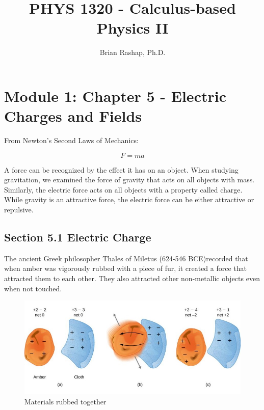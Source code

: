 \documentclass[14pt]{memoir}
\author{Brian Rashap, Ph.D.}
\title{PHYS 1320 - Calculus-based Physics II}
\begin{document}
\frontmatter

\maketitle


\mainmatter

\chapter{Module 1: Chapter 5 - Electric Charges and Fields}

From Newton's Second Laws of Mechanics:

\begin{equation}
F = ma
\end{equation}

A force can be recognized by the effect it has on an object. When studying gravitation, we examined the force of gravity that acts on all objects with mass. Similarly, the electric force acts on all objects with a property called charge. While gravity is an attractive force, the electric force can be either attractive or repulsive.  

\section{Section 5.1 Electric Charge}

The ancient Greek philosopher Thales of Miletus (624-546 BCE)recorded that when amber was vigorously rubbed with a piece of fur, it created a force that attracted them to each other. They also attracted other non-metallic objects even when not touched. 

\begin{figure}[h]
\begin{center}
\includegraphics[scale=0.40]{fig/fig_05_05.jpg}
\caption{Materials rubbed together}
\label{fig:05_05}
\end{center}
\end{figure}
\end{document}
